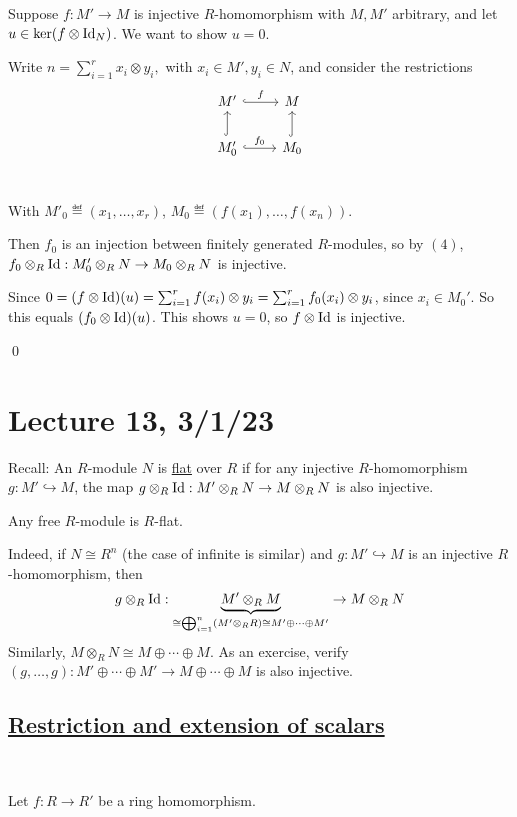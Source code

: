 \documentclass[x11names,reqno,14pt]{extarticle}
\begin{document}
Suppose $f:M'\to M$ is injective $R$-homomorphism with $M, M'$ arbitrary, and let $u \in \ker(f\otimes\operatorname{\mathrm{Id}}_N)$. We want to show $u = 0$. 

Write $n = \sum_{i=1}^rx_i\otimes y_i,$ with $x_i \in M', y_i \in N$, and consider the restrictions
\[
\begin{tikzcd}
M'\ar[r, hook, "f"] & M \\
M'_0\ar[u, hook] \ar[r, hook, "f_0"]& M_0\ar[u, hook] \\
\end{tikzcd}
\]

With $M'_0 \eqdef (x_1, \dots, x_r)$, $M_0 \eqdef (f(x_1), \dots, f(x_n))$. 

Then $f_0$ is an injection between finitely generated $R$-modules, so by $(4)$, $f_0\otimes_R\operatorname{\mathrm{Id}}:M'_0\otimes_RN\to M_0\otimes_RN$ is injective.

Since $0 = (f\otimes\operatorname{\mathrm{Id}})(u) = \sum_{i=1}^rf(x_i)\otimes y_i = \sum_{i=1}^rf_0(x_i)\otimes y_i$, since $x_i \in M_0'$. So this equals $(f_0\otimes\operatorname{\mathrm{Id}})(u)$. This shows $u = 0$, so $f\otimes\operatorname{\mathrm{Id}}$ is injective.

\qed

\section*{Lecture 13, 3/1/23}

Recall: An $R$-module $N$ is \underline{flat} over $R$ if for any injective $R$-homomorphism $g:M'\hookrightarrow M$, the map $g\otimes_R\operatorname{\mathrm{Id}}:M'\otimes_RN \to M\otimes_RN$ is also injective. 

\exm Any free $R$-module is $R$-flat. 

Indeed, if $N \cong R^n$ (the case of infinite is similar) and $g:M'\hookrightarrow M$ is an injective $R$-homomorphism, then
\[
g\otimes_R\operatorname{\mathrm{Id}}:\underbrace{M'\otimes_RM}_{\cong \bigoplus_{i=1}^n(M'\otimes_R R) \cong M'\oplus\cdots\oplus M'} \to M\otimes_RN
\]
Similarly, $M\otimes_RN \cong M \oplus \cdots \oplus M$. As an exercise, verify $(g, \dots, g):M'\oplus\cdots\oplus M' \to M\oplus\cdots\oplus M$ is also injective. 

\subsection*{\underline{Restriction and extension of scalars}}

\,

Let $f:R\to R'$ be a ring homomorphism.
\end{document}
